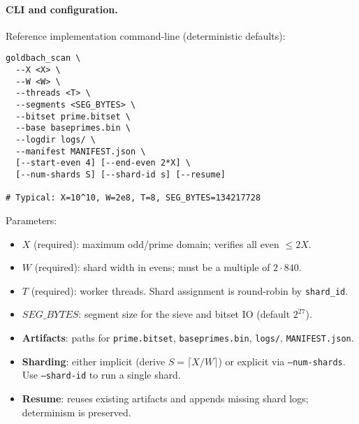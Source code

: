 \documentclass[11pt]{article}
\theoremstyle{definition}
\theoremstyle{remark}
\begin{document}
\paragraph{CLI and configuration.} Reference implementation command-line (deterministic defaults):
\begin{verbatim}
goldbach_scan \
  --X <X> \
  --W <W> \
  --threads <T> \
  --segments <SEG_BYTES> \
  --bitset prime.bitset \
  --base baseprimes.bin \
  --logdir logs/ \
  --manifest MANIFEST.json \
  [--start-even 4] [--end-even 2*X] \
  [--num-shards S] [--shard-id s] [--resume]

# Typical: X=10^10, W=2e8, T=8, SEG_BYTES=134217728
\end{verbatim}
\noindent Parameters:
\begin{itemize}
  \item \textbf{$X$} (required): maximum odd/prime domain; verifies all even $\le 2X$.
  \item \textbf{$W$} (required): shard width in evens; must be a multiple of $2\cdot 840$.
  \item \textbf{$T$} (required): worker threads. Shard assignment is round-robin by \texttt{shard\_id}.
  \item \textbf{$SEG\_BYTES$}: segment size for the sieve and bitset IO (default $2^{27}$).
  \item \textbf{Artifacts}: paths for \texttt{prime.bitset}, \texttt{baseprimes.bin}, \texttt{logs/}, \texttt{MANIFEST.json}.
  \item \textbf{Sharding}: either implicit (derive $S=\lceil X/W\rceil$) or explicit via \texttt{--num-shards}. Use \texttt{--shard-id} to run a single shard.
  \item \textbf{Resume}: reuses existing artifacts and appends missing shard logs; determinism is preserved.
\end{itemize}
\end{document}
